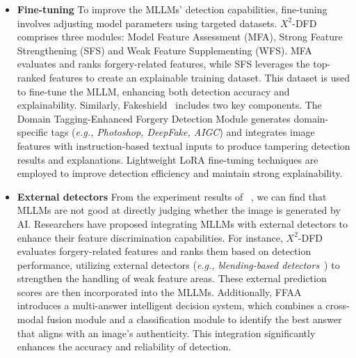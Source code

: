\begin{itemize}
\item \textbf{Fine-tuning}
To improve the MLLMs’ detection capabilities, fine-tuning involves adjusting model parameters using targeted datasets. $\textit{X}^2$-DFD~\cite{chen2024textit} comprises three modules: Model Feature Assessment (MFA), Strong Feature Strengthening (SFS) and Weak Feature Supplementing (WFS). MFA evaluates and ranks forgery-related features, while SFS leverages the top-ranked features to create an explainable training dataset. This dataset is used to fine-tune the MLLM, enhancing both detection accuracy and explainability. Similarly, Fakeshield~\cite{xu2024fakeshield} includes two key components. The Domain Tagging-Enhanced Forgery Detection Module generates domain-specific tags (\textit{e.g., Photoshop, DeepFake, AIGC}) and integrates image features with instruction-based textual inputs to produce tampering detection results and explanations. Lightweight LoRA fine-tuning techniques are employed to improve detection efficiency and maintain strong explainability.


\item \textbf{External detectors}
From the experiment results of ~\cite{ye2024loki}, we can find that MLLMs are not good at directly judging whether the image is generated by AI. Researchers have proposed integrating MLLMs with external detectors to enhance their feature discrimination capabilities. For instance, $\textit{X}^2$-DFD~\cite{chen2024textit} evaluates forgery-related features and ranks them based on detection performance, utilizing external detectors (\textit{e.g., blending-based detectors}~\cite{lin2025fake}) to strengthen the handling of weak feature areas. These external prediction scores are then incorporated into the MLLMs. Additionally, FFAA~\cite{huang2024ffaa} introduces a multi-answer intelligent decision system, which combines a cross-modal fusion module and a classification module to identify the best answer that aligns with an image's authenticity. This integration significantly enhances the accuracy and reliability of detection.

\end{itemize}

